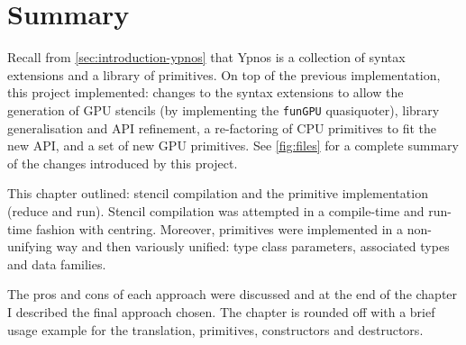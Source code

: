 \documentclass[
    12pt,
    a4paper,
    twoside,
    openright,
    ]{scrbook}
\begin{document}
\section{Summary}

Recall from \autoref{sec:introduction-ypnos} that Ypnos is a collection of
syntax extensions and a library of primitives. On top of the previous
implementation, this project implemented: changes to the syntax extensions to
allow the generation of GPU stencils (by implementing the \texttt{funGPU}
quasiquoter), library generalisation and API refinement, a re-factoring of CPU
primitives to fit the new API, and a set of new GPU primitives. See
\autoref{fig:files} for a complete summary of the changes introduced by this
project.

This chapter outlined: stencil compilation and the primitive implementation
(reduce and run). Stencil compilation was attempted in a compile-time and
run-time fashion with centring. Moreover, primitives were implemented in a
non-unifying way and then variously unified: type class parameters, associated
types and data families.

The pros and cons of each approach were discussed and at the end of the chapter
I described the final approach chosen. The chapter is rounded off with a brief
usage example for the translation, primitives, constructors and
destructors.
\end{document}
